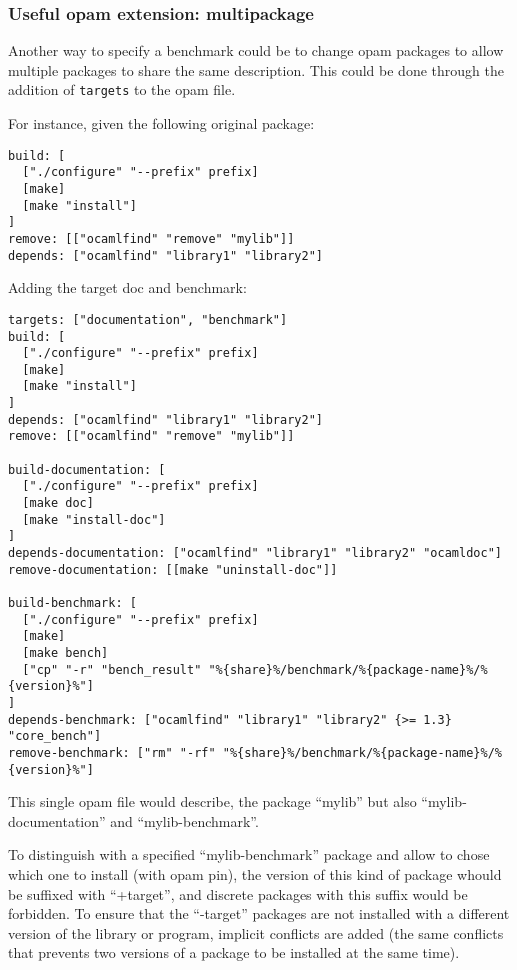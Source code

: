 \documentclass[11pt,a4paper]{article}
\begin{document}
\subsubsection{Useful opam extension: multipackage}\label{opam-multipackage}

Another way to specify a benchmark could be to change opam packages to
allow multiple packages to share the same description. This could be
done through the addition of {\tt targets} to the opam file.

For instance, given the following original package:

\begin{verbatim}
build: [
  ["./configure" "--prefix" prefix]
  [make]
  [make "install"]
]
remove: [["ocamlfind" "remove" "mylib"]]
depends: ["ocamlfind" "library1" "library2"]
\end{verbatim}

Adding the target doc and benchmark:

\begin{verbatim}
targets: ["documentation", "benchmark"]
build: [
  ["./configure" "--prefix" prefix]
  [make]
  [make "install"]
]
depends: ["ocamlfind" "library1" "library2"]
remove: [["ocamlfind" "remove" "mylib"]]

build-documentation: [
  ["./configure" "--prefix" prefix]
  [make doc]
  [make "install-doc"]
]
depends-documentation: ["ocamlfind" "library1" "library2" "ocamldoc"]
remove-documentation: [[make "uninstall-doc"]]

build-benchmark: [
  ["./configure" "--prefix" prefix]
  [make]
  [make bench]
  ["cp" "-r" "bench_result" "%{share}%/benchmark/%{package-name}%/%{version}%"]
]
depends-benchmark: ["ocamlfind" "library1" "library2" {>= 1.3} "core_bench"]
remove-benchmark: ["rm" "-rf" "%{share}%/benchmark/%{package-name}%/%{version}%"]
\end{verbatim}

This single opam file would describe, the package ``mylib'' but also
``mylib-documentation'' and ``mylib-benchmark''.

To distinguish with a specified ``mylib-benchmark'' package and allow
to chose which one to install (with opam pin), the version of this
kind of package whould be suffixed with ``+target'', and discrete
packages with this suffix would be forbidden. To ensure that the
``-target'' packages are not installed with a different version of the
library or program, implicit conflicts are added (the same conflicts
that prevents two versions of a package to be installed at the same
time).
\end{document}
